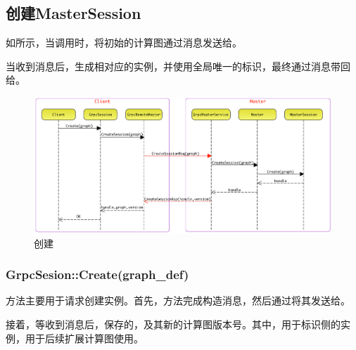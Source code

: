 \begin{content}
\begin{content}
\begin{content}
\end{content}

\subsection{创建MasterSession}

\begin{content}

如所示，当调用时，将初始的计算图通过消息发送给。

当收到消息后，生成相对应的实例，并使用全局唯一的标识，最终通过消息带回给。

\begin{figure}[H]
\centering
\includegraphics[width=1.0\textwidth]{figures/dist-create-master-session.png}
\caption{创建}
 \label{fig:dist-create-master-session}
\end{figure}

\subsubsection{GrpcSesion::Create(graph\_def)}

方法主要用于请求创建实例。首先，方法完成构造消息，然后通过将其发送给。

接着，等收到消息后，保存的，及其新的计算图版本号。其中，用于标识侧的实例，用于后续扩展计算图使用。


\end{content}
\end{content}
\end{content}
